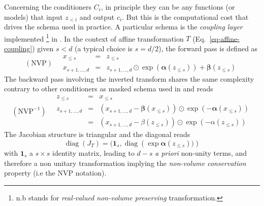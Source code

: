 \documentclass[11pt]{amsart}
\DeclareMathOperator{\diag}{diag}
\begin{document}
Concerning the conditioners $C_i$, in principle they can be any functions (or models) that input $z_{<i}$ and output $c_i$. But this is the computational cost that drives the schema used in practice. A particular schema is the \textit{coupling layer} implemented \footnote{n.b stands for \textit{real-valued non-volume preserving} transformation.} in \citep{DinhKB14,DinhSB17}. In the context of affine transformation $T$ (Eq.~\ref{eq-affine-coupling}) given $s<d$ (a typical choice is $s=d/2$), the forward pass is defined as 
\begin{equation}
(\mathrm{NVP})\quad  \begin{array}{rcl}
x_{\leq s} &=& z_{\leq s} \\
x_{s+1,\dots,d} &=& z_{s+1,\dots,d} \odot \exp(\bm{\alpha}(z_{\leq s})) + \bm{\beta}(z_{\leq s}) 
\end{array}
\label{eq-NVP_forward}
\end{equation}
The backward pass involving the inverted transform shares the same complexity contrary to other conditioners as masked schema used in \citep{Germain2015} and reads
\begin{equation}
(\mathrm{NVP}^{-1})\quad  \begin{array}{rcl}
z_{\leq s} &=& x_{\leq s} \\
z_{s+1,\dots,d} &=& (x_{s+1,\dots,d}- \bm{\beta}(x_{\leq s}))  \odot \exp(-\bm{\alpha}(x_{\leq s})) \\
&=&(x_{s+1,\dots,d}- \beta(z_{\leq s}))  \odot \exp(-\alpha(z_{\leq s}))
\end{array}
\label{eq-NVP_backward}
\end{equation}
The Jacobian structure is triangular and the diagonal reads
\begin{equation}
\diag(J_T) = (\bm{1}_s,\diag(\exp{\bm{\alpha}(z_{\leq s}))})
\end{equation}
with $\bm{1}_s$ a $s\times s$ identity matrix, leading to $d-s$ \textit{a priori} non-unity terms, and therefore a non unitary transformation implying the \textit{non-volume conservation} property (i.e the NVP notation).
\end{document}
